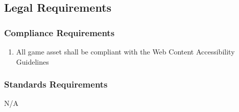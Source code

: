 \documentclass[12pt, titlepage]{article}
\begin{document}

\subsection{Legal Requirements}
\label{sub:legal_requirements}

\subsubsection{Compliance Requirements}
\label{ssub:compliance_requirements}
\begin{enumerate}[{LR}1. ]
	\item All game asset shall be compliant with the Web Content Accessibility Guidelines
\end{enumerate}

\subsubsection{Standards Requirements}
\label{ssub:standards_requirements}
N/A


\end{document}
